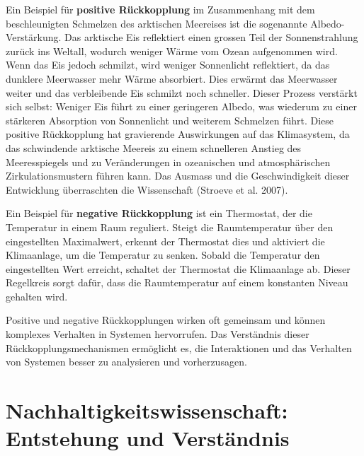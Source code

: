 \documentclass[
  nswissgerman,
  a4paper,
  DIV=11,
  numbers=noendperiod,
  oneside,
  openany]{scrreprt}
\begin{document}
Ein Beispiel für \textbf{positive Rückkopplung} im Zusammenhang mit dem
beschleunigten Schmelzen des arktischen Meereises ist die sogenannte
Albedo-Verstärkung. Das arktische Eis reflektiert einen grossen Teil der
Sonnenstrahlung zurück ins Weltall, wodurch weniger Wärme vom Ozean
aufgenommen wird. Wenn das Eis jedoch schmilzt, wird weniger Sonnenlicht
reflektiert, da das dunklere Meerwasser mehr Wärme absorbiert. Dies
erwärmt das Meerwasser weiter und das verbleibende Eis schmilzt noch
schneller. Dieser Prozess verstärkt sich selbst: Weniger Eis führt zu
einer geringeren Albedo, was wiederum zu einer stärkeren Absorption von
Sonnenlicht und weiterem Schmelzen führt. Diese positive Rückkopplung
hat gravierende Auswirkungen auf das Klimasystem, da das schwindende
arktische Meereis zu einem schnelleren Anstieg des Meeresspiegels und zu
Veränderungen in ozeanischen und atmosphärischen Zirkulationsmustern
führen kann. Das Ausmass und die Geschwindigkeit dieser Entwicklung
überraschten die Wissenschaft (Stroeve et al. 2007).

Ein Beispiel für \textbf{negative Rückkopplung} ist ein Thermostat, der
die Temperatur in einem Raum reguliert. Steigt die Raumtemperatur über
den eingestellten Maximalwert, erkennt der Thermostat dies und aktiviert
die Klimaanlage, um die Temperatur zu senken. Sobald die Temperatur den
eingestellten Wert erreicht, schaltet der Thermostat die Klimaanlage ab.
Dieser Regelkreis sorgt dafür, dass die Raumtemperatur auf einem
konstanten Niveau gehalten wird.

Positive und negative Rückkopplungen wirken oft gemeinsam und können
komplexes Verhalten in Systemen hervorrufen. Das Verständnis dieser
Rückkopplungsmechanismen ermöglicht es, die Interaktionen und das
Verhalten von Systemen besser zu analysieren und vorherzusagen.

\section{Nachhaltigkeitswissenschaft: Entstehung und
Verständnis}\label{nachhaltigkeitswissenschaft-entstehung-und-verstuxe4ndnis}
\end{document}
